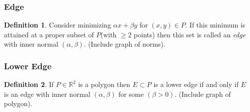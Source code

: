 \documentclass[]{article}
\theoremstyle{definition}
\newtheorem*{defn}{Definition}
\begin{document}
			\subsubsection{Edge}
			\begin{defn}
			Consider minimizing $\alpha x+\beta y$ for $(x,y)\in P.$ If this minimum is attained at a proper subset of $P$(with $\geq$2 points) then this set is called an \emph{edge} with inner normal $(\alpha,\beta)$. (Include graph of norms).
			\end{defn}
			\subsubsection{Lower Edge}
				\begin{defn}
			If $P \in \mathbb{R}^2$ is a polygon then $E \subset P$ is a lower edge if and only if $E$ is an edge with inner normal $(\alpha,\beta)$ for some $(\beta >0)$. (Include graph of polygon).
			\end{defn}
\end{document}

